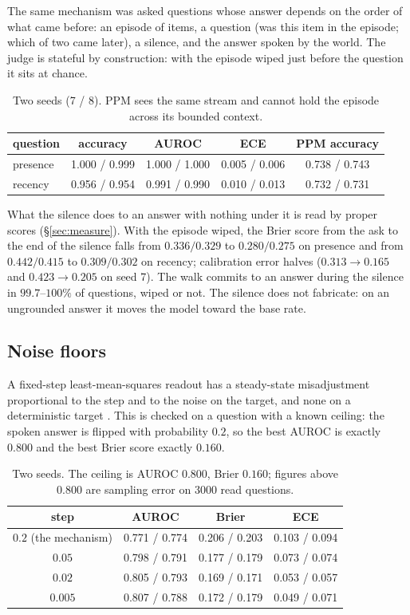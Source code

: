 \documentclass[11pt,a4paper]{article}
\theoremstyle{plain}
\theoremstyle{definition}
\theoremstyle{remark}
\begin{document}
The same mechanism was asked questions whose answer depends on the order of
what came before: an episode of items, a question (was this item in the
episode; which of two came later), a silence, and the answer spoken by the
world. The judge is stateful by construction: with the episode wiped just
before the question it sits at chance.

\begin{table}[h]
\centering
\small
\begin{tabular}{lcccc}
\toprule
question & accuracy & AUROC & ECE & PPM accuracy\\
\midrule
presence & 1.000 / 0.999 & 1.000 / 1.000 & 0.005 / 0.006 & 0.738 / 0.743\\
recency & 0.956 / 0.954 & 0.991 / 0.990 & 0.010 / 0.013 & 0.732 / 0.731\\
\bottomrule
\end{tabular}
\caption{Two seeds (7 / 8). PPM sees the same stream and cannot hold the
episode across its bounded context.}
\label{tab:judge}
\end{table}

What the silence does to an answer with nothing under it is read by proper
scores (\S\ref{sec:measure}). With the episode wiped, the Brier score from the
ask to the end of the silence falls from $0.336/0.329$ to $0.280/0.275$ on
presence and from $0.442/0.415$ to $0.309/0.302$ on recency; calibration error
halves ($0.313\to0.165$ and $0.423\to0.205$ on seed 7). The walk commits to an
answer during the silence in $99.7$--$100\%$ of questions, wiped or not. The
silence does not fabricate: on an ungrounded answer it moves the model toward
the base rate.

\subsection{Noise floors}
\label{sec:floors}

A fixed-step least-mean-squares readout has a steady-state misadjustment
proportional to the step and to the noise on the target, and none on a
deterministic target \citep{widrow1960adaptive}. This is checked on a question
with a known ceiling: the spoken answer is flipped with probability $0.2$, so the
best AUROC is exactly $0.800$ and the best Brier score exactly $0.160$.

\begin{table}[h]
\centering
\small
\begin{tabular}{cccc}
\toprule
step & AUROC & Brier & ECE\\
\midrule
$0.2$ (the mechanism) & 0.771 / 0.774 & 0.206 / 0.203 & 0.103 / 0.094\\
$0.05$ & 0.798 / 0.791 & 0.177 / 0.179 & 0.073 / 0.074\\
$0.02$ & 0.805 / 0.793 & 0.169 / 0.171 & 0.053 / 0.057\\
$0.005$ & 0.807 / 0.788 & 0.172 / 0.179 & 0.049 / 0.071\\
\bottomrule
\end{tabular}
\caption{Two seeds. The ceiling is AUROC $0.800$, Brier $0.160$; figures above
$0.800$ are sampling error on 3000 read questions.}
\label{tab:noisy}
\end{table}
\end{document}
